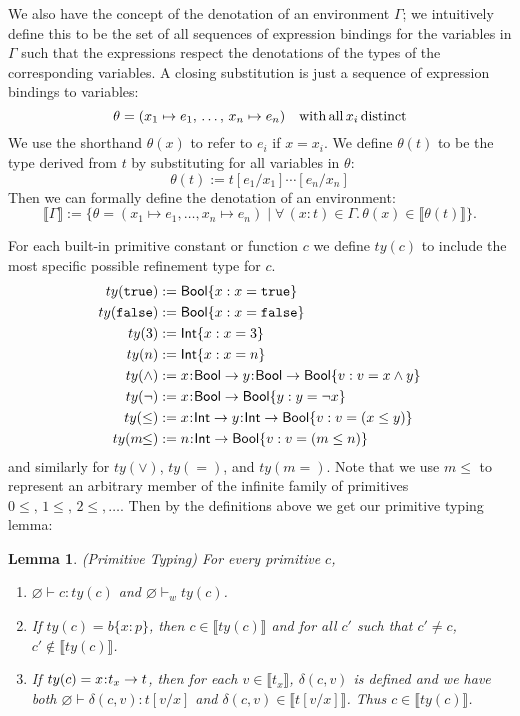 \documentclass[11pt]{article}
\newtheorem{lemma}[theorem]{Lemma}
\newcommand{\bind}{\hspace{0.05em}{:}\hspace{0.05em}} %
\newcommand{\col}{\mathbin{:}}       %
\newcommand{\lb}{\llbracket}         %
\newcommand{\rb}{\rrbracket}         %
\newcommand{\true}{\mathtt{true}}
\newcommand{\Int}{{\sf Int}}
\newcommand{\Bool}{{\sf Bool}}
\newcommand{\functype}[3]{#1\bind #2 \rightarrow #3}
\begin{document}
We also have the concept of the denotation of an environment $\Gamma$; we intuitively define this to be the set of all sequences of expression bindings for the variables in $\Gamma$ such that the expressions respect the denotations of the types of the corresponding variables.
A closing substitution is just a sequence of expression bindings to variables:
\[
\theta = (x_1\mapsto e_1,\,\ldots,\, x_n\mapsto e_n)
\quad {\rm with\, all}\, x_i\, {\rm distinct}
\]
We use the shorthand $\theta(x)$ to refer to $e_i$ if $x = x_i$. We define $\theta(t)$ to be the type derived from $t$ by substituting for all variables in $\theta$:
\[
\theta(t) := t[e_1/x_1]\cdots[e_n/x_n]
\]
Then we can formally define the denotation of an environment:
\[
\lb \Gamma \rb := \{ \theta = (x_1 \mapsto e_1,\ldots, x_n \mapsto e_n) \; | \;
\forall\, (x:t) \in \Gamma.\, \theta(x) \in \lb\theta(t)\rb \}.
\]

For each built-in primitive constant or function $c$ we define $ty(c)$ to include the most specific possible refinement type for $c$.
\begin{align*}
ty(\true) :=&\; \Bool\{ x : x = \true \}\\
ty({\tt false}) :=&\; \Bool\{ x : x = {\tt false}\}\\
ty(3) :=&\; \Int\{ x : x = 3\} \\
ty(n) :=&\; \Int\{ x : x = n\} \\
ty(\wedge) :=&\; 	x\bind\Bool \rightarrow y\bind\Bool \rightarrow \Bool\{ v : v = x \wedge y\}\\
ty(\neg) :=&\; x\bind\Bool \rightarrow \Bool\{ y : y = \neg x\}\\
ty(\leq) :=&\; x\bind\Int \rightarrow y\bind\Int \rightarrow \Bool\{v : v = (x \leq y)\}\\
ty(m\!\!\leq) :=&\; n\bind\Int \rightarrow \Bool\{v : v = (m \leq n)\} 
\end{align*}
and similarly for $ty(\vee)$, $ty(=)$, and $ty(m\!\!=)$. Note that we use $m\!\!\leq$ to represent an arbitrary member of the infinite family of primitives $0\!\!\leq,\, 1\!\!\leq,\, 2\!\!\leq,\ldots$. Then by the definitions above we get our primitive typing lemma:
\begin{lemma}(Primitive Typing) For every primitive $c$, 
\begin{enumerate}
\item $\varnothing \vdash c : ty(c)$ and $\varnothing \vdash_w ty(c)$.  
\item If $ty(c) = b\{x \col p\}$, then $c \in \lb ty(c) \rb$ and for all $c'$ such that $c' \neq c$, $c' \not\in \lb ty(c)\rb$.
\item If $ty(c) = \functype{x}{t_x}{t}$, then for each $v \in \lb t_x\rb$, $\delta(c,v)$ is defined and we have both $\varnothing \vdash \delta(c,v) : t[v/x] $ and $\delta(c,v) \in \lb t[v/x] \rb$. Thus $c \in \lb ty(c) \rb$.
\end{enumerate}\label{prim-typing}
\end{lemma}
\end{document}

